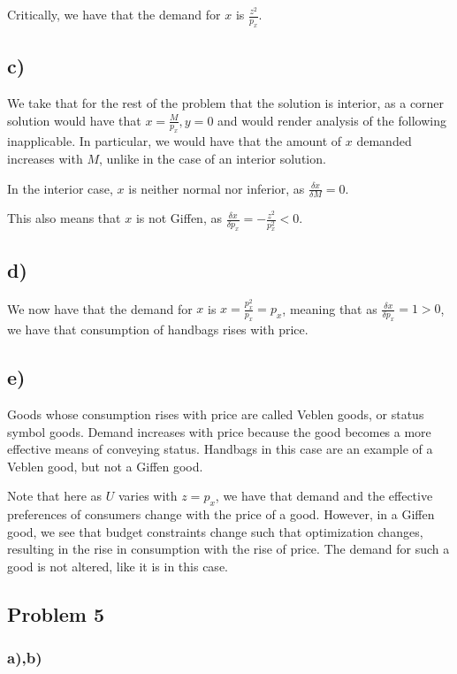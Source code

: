 \documentclass[12pt,letterpaper]{article}
\theoremstyle{definition}
\begin{document}
Critically, we have that the demand for $x$ is $\frac{z^2}{p_x}$.

\subsection*{c)}
We take that for the rest of the problem that the solution is interior, 
as a corner solution would have that $x = \frac{M}{p_x}, y = 0$ and would
render analysis of the following inapplicable. 
In particular, we would have that the amount of $x$ demanded increases with $M$,
unlike in the case of an interior solution.

In the interior case, $x$ is neither normal nor inferior, as $\frac{\delta x}{\delta M} = 0$.

This also means that $x$ is not Giffen, as $\frac{\delta x}{\delta p_x} = -\frac{z^2}{p_x^2} < 0$.

\subsection*{d)}

We now have that the demand for $x$ is $x = \frac{p_x^2}{p_x} = p_x$, meaning that
as $\frac{\delta x}{\delta p_x} = 1 > 0$, we have that consumption of handbags
rises with price.

\subsection*{e)}

Goods whose consumption rises with price are called Veblen goods, or status symbol goods.
Demand increases with price because the good becomes a more effective means of conveying status.
Handbags in this case are an example of a Veblen good, but not a Giffen good.

Note that here as $U$ varies with $z = p_x$, we have that demand and the 
effective preferences of consumers change with the price of a good.
However, in a Giffen good, we see that budget constraints change such that optimization changes,
resulting in the rise in consumption with the rise of price. The demand for such
a good is not altered, like it is in this case.

\subsection*{Problem 5}

\subsubsection*{a),b)}
\end{document}
